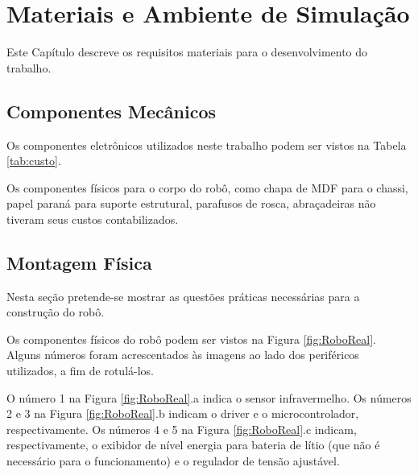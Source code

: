 \chapter{Materiais e Ambiente de Simulação}
\vspace{-2.5 cm}

Este Capítulo descreve os requisitos materiais para o desenvolvimento do
trabalho. 

\section{Componentes Mecânicos}

Os componentes eletrônicos utilizados neste trabalho podem ser vistos na Tabela 
\ref{tab:custo}.



Os componentes físicos para o corpo do robô, como chapa de MDF para o chassi, papel 
paraná para suporte estrutural, parafusos de rosca, abraçadeiras não tiveram 
seus custos contabilizados.

\section{Montagem Física}

	Nesta seção pretende-se mostrar as questões práticas necessárias para a construção do 
	robô.
	
	Os componentes físicos do robô podem ser vistos na Figura \ref{fig:RoboReal}. Alguns
	números foram acrescentados às imagens ao lado dos periféricos utilizados, a fim de 
	rotulá-los.
	
	
	
	O número 1 na Figura \ref{fig:RoboReal}.a indica o sensor infravermelho. Os números 2 e 3
	na Figura \ref{fig:RoboReal}.b indicam o driver e o microcontrolador, respectivamente.
	Os números 4 e 5 na Figura \ref{fig:RoboReal}.c indicam, respectivamente, o exibidor
	de nível energia para bateria de lítio (que não é necessário para o funcionamento) 
	e o regulador de tensão ajustável. 
	
